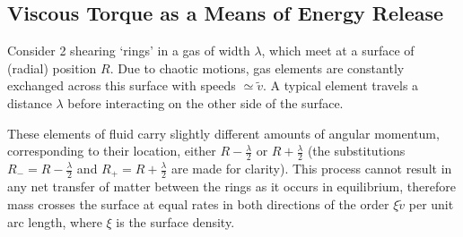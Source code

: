 \subsection{Viscous Torque as a Means of Energy Release}
Consider 2 shearing `rings' in a gas of width $\lambda$, which meet at a surface of (radial) position $R$. Due to chaotic motions, gas
elements are constantly exchanged across this surface with speeds $\simeq \tilde v$. A typical element travels a distance $\lambda$ before
interacting on the other side of the surface.

These elements of fluid carry slightly different amounts of angular momentum, corresponding
to their location, either $R - \frac{\lambda}{2}$ or $R + \frac{\lambda}{2}$ (the substitutions $R_- = R - \frac{\lambda}{2}$ and
$R_+ = R + \frac{\lambda}{2}$ are made for clarity). This process cannot result in any net transfer of matter between the rings as
it occurs in equilibrium, therefore mass crosses the surface at equal rates in both directions of the order $\xi \widetilde{v}$ per unit
arc length, where $\xi$ is the surface density.

